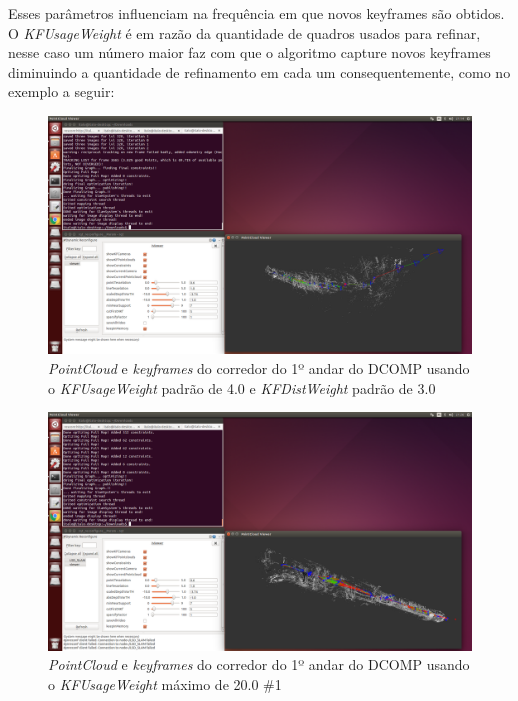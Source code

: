 

Esses parâmetros influenciam na frequência em que novos keyframes são obtidos. O \textit{KFUsageWeight} é em razão da quantidade de quadros usados para refinar, nesse caso um número maior faz com que o algoritmo capture novos keyframes diminuindo a quantidade de refinamento em cada um consequentemente, como no exemplo a seguir:

\begin{figure}[!htb]
	\centering
		\includegraphics[width= \textwidth]{Imagens/figura3-33.png}
	\caption{\textit{PointCloud} e \textit{keyframes} do corredor do 1º andar do DCOMP usando o \textit{KFUsageWeight} padrão de 4.0 e \textit{KFDistWeight} padrão de 3.0}
	\label{fig3:31}
\end{figure}

\begin{figure}[!htb]
	\centering
		\includegraphics[width= \textwidth]{Imagens/figura3-34.png}
	\caption{\textit{PointCloud} e \textit{keyframes} do corredor do 1º andar do DCOMP usando o \textit{KFUsageWeight} máximo de 20.0 \#1}
	\label{fig3:32}
\end{figure}

